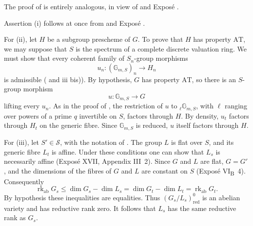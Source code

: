 The proof of  is entirely analogous, in view of
 and Exposé .


Assertion \textup{(i)} follows at once from  and
Exposé .

For \textup{(ii)}, let \(H\) be a subgroup prescheme of \(G\). To
prove that \(H\) has property \(\mathrm{AT}\), we may suppose that
\(S\) is the spectrum of a complete discrete valuation ring. We
must show that every coherent family of \(S_n\)-group morphisms
\[
  u_n:(\mathbb G_{m,S})_n\longrightarrow H_n
\]
is admissible ( and  \textup{iii bis)}).
By hypothesis, \(G\) has property \(\mathrm{AT}\), so there is an
\(S\)-group morphism
\[
  u:\mathbb G_{m,S}\longrightarrow G
\]
lifting every \(u_n\). As in the proof of , the
restriction of \(u\) to \({}_\ell\mathbb G_{m,S}\), with \(\ell\)
ranging over powers of a prime \(q\) invertible on \(S\), factors
through \(H\). By density, \(u_t\) factors through \(H_t\) on the
generic fibre. Since \(\mathbb G_{m,S}\) is reduced, \(u\) itself
factors through \(H\).

For \textup{(iii)}, let \(S'\in\mathcal S\), with the notation of
. The group \(L\) is flat over \(S\), and its generic
fibre \(L_t\) is affine. Under these conditions one can show that \(L_s\) is
necessarily affine (Exposé XVII, Appendix III~2). Since \(G\) and
\(L\) are flat, \(G=G'\), and the dimensions of the fibres of \(G\)
and \(L\) are constant on \(S\) (Exposé VI\textsubscript{B}~4).
Consequently
\[
 \operatorname{rk}_{\mathrm{ab}}G_s
 \leq \dim G_s-\dim L_s
 =\dim G_t-\dim L_t
 =\operatorname{rk}_{\mathrm{ab}}G_t.
\]
By hypothesis these inequalities are equalities. Thus
\((G_s/L_s)^0_{\mathrm{red}}\) is an abelian variety and has
reductive rank zero. It follows that \(L_s\) has the same reductive
rank as \(G_s\).

